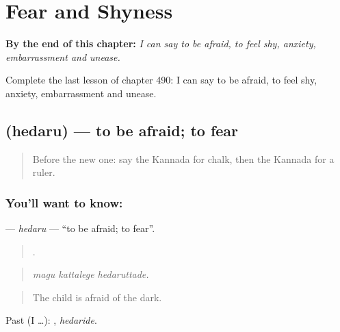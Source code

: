 
\chapter{Fear and Shyness}
\label{ch:ka-fear-and-shyness}

\begin{chapteropening}
\textbf{By the end of this chapter:} \emph{I can say to be afraid, to feel shy, anxiety, embarrassment and unease.}

Complete the last lesson of chapter 490: I can say to be afraid, to feel shy, anxiety, embarrassment and unease.
\end{chapteropening}

\section[\texorpdfstring{\kn{ಹೆದರು} (hedaru)}{ಹೆದರು (hedaru)}]{ (hedaru) — to be afraid; to fear}

\label{lesson:KA-C490-hedaru}



\begin{quote}
Before the new one: say the Kannada for chalk, then the Kannada for a ruler.
\end{quote}

\subsection*{You'll want to know: }
\textbf{} — \emph{hedaru} — \textquotedblleft{}to be afraid; to fear\textquotedblright{}.

\begin{quote}
  .
\end{quote}

\begin{quote}
\emph{magu kattalege hedaruttade.}
\end{quote}

\begin{quote}
The child is afraid of the dark.
\end{quote}

Past (I …): , \emph{hedaride}.

